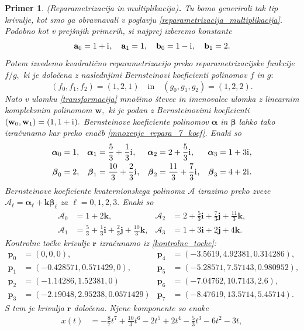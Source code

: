 \documentclass[12pt,a4paper,twoside]{article}
\newcommand{\iu}{\mathrm{i}\mkern1mu} %
\theoremstyle{definition} %
\theoremstyle{plain} %
\theoremstyle{primerstyle}
\newtheorem{primer}[definicija]{Primer}
\numberwithin{equation}{section}  %
\newcommand{\aV}{\mathbf{a}}
\newcommand{\bV}{\mathbf{b}}
\newcommand{\pV}{\mathbf{p}}
\newcommand{\rV}{\mathbf{r}}
\newcommand{\iV}{\mathbf{i}}
\newcommand{\jV}{\mathbf{j}}
\newcommand{\kV}{\mathbf{k}}
\newcommand{\wV}{\mathbf{w}}
\newcommand{\AQ}{\mathcal{A}}
\newcommand{\balpha}{\boldsymbol \alpha}
\newcommand{\bbeta}{\boldsymbol \beta}
\begin{document}
\begin{primer}
	\textnormal{ }(Reparametrizacija in multiplikacija)\textbf{.}
	Tu bomo generirali tak tip krivulje, kot smo ga obravnavali v poglavju \ref{reparametrizacija_multiplikacija}. Podobno kot v prejšnjih primerih, si najprej izberemo konstante
	\begin{equation*}
		\aV_0=1+\iu,\quad\aV_1=1,\quad\bV_0=1-\iu,\quad\bV_1=2.
	\end{equation*}
	Potem izvedemo kvadratično reparametrizacijo preko reparametrizacijske funkcije $f/g,$ ki je določena z naslednjimi Bernsteinovi koeficienti polinomov $f$ in $g:$
	$$(f_0,f_1,f_2)=(1,2,1)\quad\text{in}\quad(g_0,g_1,g_2)=(1,2,2).$$ Nato v ulomku \eqref{transformacija} množimo števec in imenovalec ulomka z linearnim kompleksnim polinomom $\wV,$ ki je podan z Bernsteinovimi koeficienti $(\wV_0,\wV_1)=(1,1+\iu).$ Bernsteinove koeficiente polinomov $\balpha$ in $\bbeta$ lahko tako izračunamo kar preko enačb \eqref{mnozenje_repara_7_koef}. Enaki so
	\begin{align*}
		\balpha_0&=1,&\balpha_1&=\frac{5}{3}+\frac{1}{3}\iu,&\balpha_2&=2+\frac{5}{3}\iu,&\balpha_3&=1+3\iu,\\
		\bbeta_0&=2,&\bbeta_1&=\frac{10}{3}+\frac{2}{3}\iu,&\bbeta_2&=\frac{11}{3}+\frac{7}{3}\iu,&\bbeta_3&=4+2\iu.
	\end{align*}
	Bernsteinove koeficiente kvaternionskega polinoma $\AQ$ izrazimo preko zveze $\AQ_\ell=\balpha_\ell+\kV\bbeta_\ell$ za $\ell=0,1,2,3.$ Enaki so
	\begin{align*}
		\AQ_0&=1+2\kV,&\AQ_2&=2+\frac{5}{3}\iV+\frac{7}{3}\jV+\frac{11}{3}\kV,\\
		\AQ_1&=\frac{5}{3}+\frac{1}{3}\iV+\frac{2}{3}\jV+\frac{10}{3}\kV,&\AQ_3&=1+3\iV+2\jV+4\kV.
	\end{align*}
	Kontrolne točke krivulje $\rV$ izračunamo iz \eqref{kontrolne_tocke}:
	\begin{align*}
		\pV_0&=(0,0,0),&\pV_4&=(-3.5619, 4.92381, 0.314286),\\
		\pV_1&=(-0.428571, 0.571429, 0),&\pV_5&=(-5.28571, 7.57143, 0.980952),\\
		\pV_2&=(-1.14286, 1.52381, 0)&\pV_6&=(-7.04762, 10.7143, 2.6),\\
		\pV_3&=(-2.19048, 2.95238, 0.0571429)&\pV_7&=(-8.47619, 13.5714, 5.45714).
	\end{align*}
	S tem je krivulja $\rV$ določena. Njene komponente so enake
	\begin{align*}
		x(t)&=-\frac{8}{7}t^7+\frac{10}{3}t^6-2t^5+2t^4-\frac{5}{3}t^3-6t^2-3t,\\

\end{align*}
\end{primer}
\end{document}
